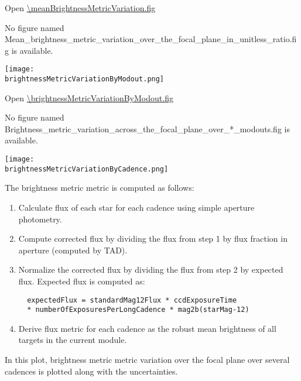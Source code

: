 \meanBrightnessMetricVariationCaption

Open \url{\meanBrightnessMetricVariation.fig}

\else
No figure named
Mean\_brightness\_metric\_variation\_over\_the\_focal\_plane\_in\_unitless\_ratio.fig is
available.
\fi
\clearpage

\ifdefined \brightnessMetricVariationByModout

\begin{center}
  \texttt{[image: \\brightnessMetricVariationByModout.png]}
\end{center}

\brightnessMetricVariationByModoutCaption

Open \url{\brightnessMetricVariationByModout.fig}

\else
No figure named
Brightness\_metric\_variation\_across\_the\_focal\_plane\_over\_*\_modouts.fig is
available.
\fi
\clearpage

\ifdefined \brightnessMetricVariationByCadence

\begin{center}
  \texttt{[image: \\brightnessMetricVariationByCadence.png]}
\end{center}

The brightness metric metric is computed as follows:

\begin{enumerate}
\item 
  Calculate flux of each star for each cadence using simple aperture
  photometry.
\item 
  Compute corrected flux by dividing the flux from step 1 by flux
  fraction in aperture (computed by TAD).
\item 
  Normalize the corrected flux by dividing the flux from step 2 by
  expected flux. Expected flux is computed as:

\begin{verbatim}
  expectedFlux = standardMag12Flux * ccdExposureTime 
  * numberOfExposuresPerLongCadence * mag2b(starMag-12)
\end{verbatim}

\item 
  Derive flux metric for each cadence as the robust mean brightness of
  all targets in the current module.
\end{enumerate}

In this plot, brightness metric metric variation over the focal plane
over several cadences is plotted along with the uncertainties.


